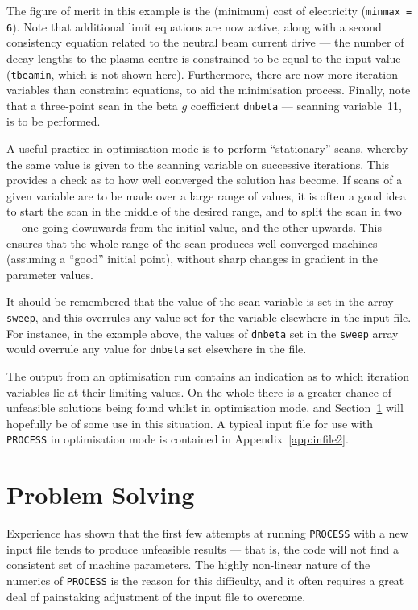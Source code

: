 \documentclass[11pt,a4paper]{report}
\newcommand{\process}{\mbox{\texttt{PROCESS}}}
\begin{document}
The figure of merit in this example is the (minimum) cost of electricity
(\texttt{minmax = 6}). Note that additional limit equations are now active,
along with a second consistency equation related to the neutral beam current
drive --- the number of decay lengths to the plasma centre is constrained to
be equal to the input value (\texttt{tbeamin}, which is not shown here).
Furthermore, there are now more iteration variables than constraint equations,
to aid the minimisation process.  Finally, note that a three-point scan in the
beta $g$ coefficient \texttt{dnbeta} --- scanning variable~11, is to be
performed.

A useful practice in optimisation mode is to perform ``stationary'' scans,
whereby the same value is given to the scanning variable on successive
iterations. This provides a check as to how well converged the solution has
become. If scans of a given variable are to be made over a large range of
values, it is often a good idea to start the scan in the middle of the desired
range, and to split the scan in two --- one going downwards from the initial
value, and the other upwards.  This ensures that the whole range of the scan
produces well-converged machines (assuming a ``good'' initial point), without
sharp changes in gradient in the parameter values.

It should be remembered that the value of the scan variable is set in the
array \texttt{sweep}, and this overrules any value set for the variable
elsewhere in the input file. For instance, in the example above, the values of
\texttt{dnbeta} set in the \texttt{sweep} array would overrule any value for
\texttt{dnbeta} set elsewhere in the file.

The output from an optimisation run contains an indication as to which
iteration variables lie at their limiting values. On the whole there is a
greater chance of unfeasible solutions being found whilst in optimisation
mode, and Section~\ref{sec:problems} will hopefully be of some use in this
situation. A typical input file for use with \process\/ in optimisation mode
is contained in Appendix~\ref{app:infile2}.

\section{Problem Solving}
\label{sec:problems}

Experience has shown that the first few attempts at running \process\/ with a
new input file tends to produce unfeasible results --- that is, the code will
not find a consistent set of machine parameters. The highly non-linear nature
of the numerics of \process\/ is the reason for this difficulty, and it often
requires a great deal of painstaking adjustment of the input file to overcome.
\end{document}
